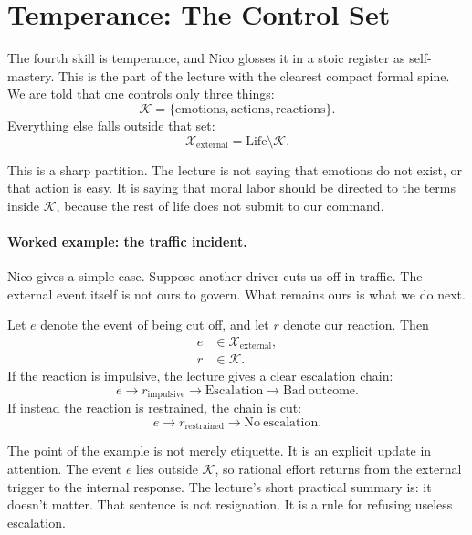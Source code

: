 \section{Temperance: The Control Set}

The fourth skill is temperance, and Nico glosses it in a stoic register as self-mastery. This is the part of the lecture with the clearest compact formal spine. We are told that one controls only three things:
\begin{equation}
\mathcal{K}=\{\mathrm{emotions},\mathrm{actions},\mathrm{reactions}\}.
\end{equation}
Everything else falls outside that set:
\begin{equation}
\mathcal{X}_{\mathrm{external}}=\mathrm{Life}\setminus \mathcal{K}.
\end{equation}

This is a sharp partition. The lecture is not saying that emotions do not exist, or that action is easy. It is saying that moral labor should be directed to the terms inside \(\mathcal{K}\), because the rest of life does not submit to our command.

\paragraph{Worked example: the traffic incident.}
Nico gives a simple case. Suppose another driver cuts us off in traffic. The external event itself is not ours to govern. What remains ours is what we do next.

Let \(e\) denote the event of being cut off, and let \(r\) denote our reaction. Then
\begin{align}
e &\in \mathcal{X}_{\mathrm{external}},\\
r &\in \mathcal{K}.
\end{align}
If the reaction is impulsive, the lecture gives a clear escalation chain:
\begin{equation}
e \to r_{\mathrm{impulsive}} \to \mathrm{Escalation} \to \mathrm{Bad\ outcome}.
\end{equation}
If instead the reaction is restrained, the chain is cut:
\begin{equation}
e \to r_{\mathrm{restrained}} \to \mathrm{No\ escalation}.
\end{equation}

The point of the example is not merely etiquette. It is an explicit update in attention. The event \(e\) lies outside \(\mathcal{K}\), so rational effort returns from the external trigger to the internal response. The lecture's short practical summary is: it doesn't matter. That sentence is not resignation. It is a rule for refusing useless escalation.

